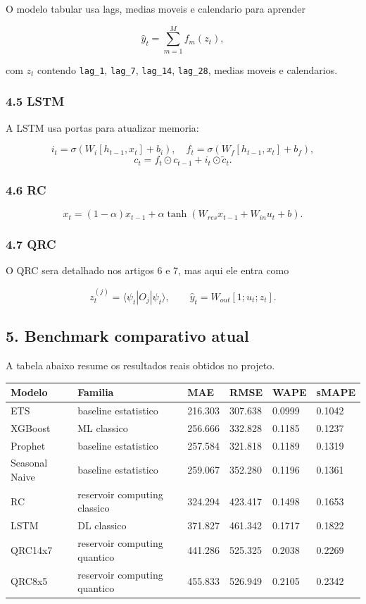 \documentclass[12pt]{article}
\begin{document}
O modelo tabular usa lags, medias moveis e calendario para aprender

\[
\hat{y}_t = \sum_{m=1}^M f_m(z_t),
\]

com \(z_t\) contendo \texttt{lag\_1}, \texttt{lag\_7}, \texttt{lag\_14}, \texttt{lag\_28}, medias moveis e calendarios.

\subsubsection{4.5 LSTM}\label{45-lstm}

A LSTM usa portas para atualizar memoria:

\[
i_t = \sigma(W_i [h_{t-1}, x_t] + b_i), \quad
f_t = \sigma(W_f [h_{t-1}, x_t] + b_f),
\]
\[
c_t = f_t \odot c_{t-1} + i_t \odot \tilde{c}_t.
\]

\subsubsection{4.6 RC}\label{46-rc}

\[
x_t = (1 - \alpha) x_{t-1} + \alpha \tanh(W_{res} x_{t-1} + W_{in} u_t + b).
\]

\subsubsection{4.7 QRC}\label{47-qrc}

O QRC sera detalhado nos artigos 6 e 7, mas aqui ele entra como

\[
z_t^{(j)} = \langle \psi_t | O_j | \psi_t \rangle,
\qquad
\hat{y}_t = W_{out} [1; u_t; z_t].
\]

\subsection{5. Benchmark comparativo atual}\label{5-benchmark-comparativo-atual}

A tabela abaixo resume os resultados reais obtidos no projeto.

\begin{longtable}[]{@{}llllll@{}}
\toprule\noalign{}
Modelo & Familia & MAE & RMSE & WAPE & sMAPE \\
\midrule\noalign{}
\endhead
\bottomrule\noalign{}
\endlastfoot
ETS & baseline estatistico & 216.303 & 307.638 & 0.0999 & 0.1042 \\
XGBoost & ML classico & 256.666 & 332.828 & 0.1185 & 0.1237 \\
Prophet & baseline estatistico & 257.584 & 321.818 & 0.1189 & 0.1319 \\
Seasonal Naive & baseline estatistico & 259.067 & 352.280 & 0.1196 & 0.1361 \\
RC & reservoir computing classico & 324.294 & 423.417 & 0.1498 & 0.1653 \\
LSTM & DL classico & 371.827 & 461.342 & 0.1717 & 0.1822 \\
QRC14x7 & reservoir computing quantico & 441.286 & 525.325 & 0.2038 & 0.2269 \\
QRC8x5 & reservoir computing quantico & 455.833 & 526.949 & 0.2105 & 0.2342 \\
\end{longtable}
\end{document}
